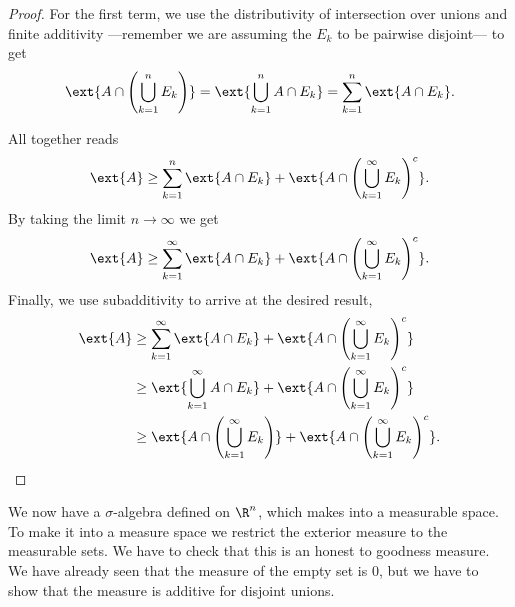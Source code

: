 \documentclass[12pt,oneside]{book}
\begin{document}
\begin{proof}
	For the first term, we use the distributivity of intersection over unions and finite additivity ---remember we are assuming the \( E_k \) to be pairwise disjoint--- to get
	\begin{equation*}
		\ext{A \cap \left(\bigcup_{k = 1}^n E_k\right)} = \ext{\bigcup_{k = 1}^n A \cap E_k} = \sum_{k = 1}^{n} \ext{A \cap E_k}.
	\end{equation*}

	All together reads
	\begin{equation*}
		\ext{A} \geq \sum_{k = 1}^{n} \ext{A \cap E_k} + \ext{A \cap \left(\bigcup_{k = 1}^\infty E_k\right)^c}.
	\end{equation*}
	By taking the limit \( n \to \infty \) we get
	\begin{equation*}
		\ext{A} \geq \sum_{k = 1}^\infty \ext{A \cap E_k} + \ext{A \cap \left(\bigcup_{k = 1}^\infty E_k\right)^c}.
	\end{equation*}
	Finally, we use subadditivity to arrive at the desired result,
	\begin{align*}
		\ext{A} & \geq \sum_{k = 1}^\infty \ext{A \cap E_k} + \ext{A \cap \left(\bigcup_{k = 1}^\infty E_k\right)^c} \\
						& \geq \ext{\bigcup_{k = 1}^\infty A \cap E_k} + \ext{A \cap \left(\bigcup_{k = 1}^\infty E_k\right)^c} \\
						& \geq \ext{A \cap \left(\bigcup_{k = 1}^\infty E_k\right)} + \ext{A \cap \left(\bigcup_{k = 1}^\infty E_k\right)^c}.
	\end{align*}
\end{proof}

We now have a \( \sigma \)-algebra defined on \( \R^n \), which makes into a measurable space. To make it into a measure space we restrict the exterior measure to the measurable sets. We have to check that this is an honest to goodness measure. We have already seen that the measure of the empty set is 0, but we have to show that the measure is additive for disjoint unions.
\end{document}
